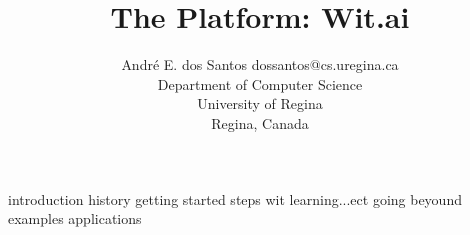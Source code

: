 \documentclass[twoside,11pt]{article}
\begin{document}
\title{The Platform: Wit.ai}

\author{\name André E. dos Santos \email dossantos@cs.uregina.ca \\
\addr Department of Computer Science \\
University of Regina \\ 
Regina, Canada
}



\maketitle

\begin{abstract}%
\end{abstract}




introduction
history
getting started
steps wit learning...ect
going beyound
examples applications


%
%
%
%
%

\vskip 0.2in

\end{document}
